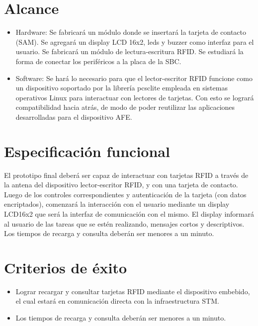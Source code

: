 \section{Alcance}

\begin{itemize}

\item Hardware: Se fabricar\'a un m\'odulo donde se insertar\'a la tarjeta de contacto (SAM).
Se agregar\'a un display LCD 16x2, leds y buzzer como interfaz para el usuario. Se fabricar\'a un m\'odulo de lectura-escritura RFID. Se estudiar\'a la forma de conectar los perif\'ericos a la placa de la SBC.

\item Software: Se har\'a lo necesario para que el lector-escritor RFID funcione como un dispositivo soportado por la librer\'ia pcsclite empleada en sistemas operativos Linux para interactuar con lectores de tarjetas. Con esto se lograr\'a compatibilidad hacia atr\'as, de modo de poder reutilizar las aplicaciones desarrolladas para el dispositivo AFE.
    
\end{itemize}

\section{Especificaci\'on funcional}

El prototipo final deber\'a ser capaz de interactuar con tarjetas RFID a trav\'es de la antena del dispositivo lector-escritor RFID, y con una tarjeta de contacto. Luego de los controles correspondientes y autenticaci\'on de la tarjeta (con datos encriptados), comenzar\'a la interacci\'on con el usuario mediante un display LCD16x2 que ser\'a la interfaz de comunicaci\'on con el mismo. El display informar\'a al usuario de las tareas que se est\'en realizando, mensajes cortos y descriptivos. Los tiempos de recarga y consulta deber\'an ser menores a un minuto.

\section{Criterios de \'exito}

\begin{itemize}

\item Lograr recargar y consultar tarjetas RFID mediante el dispositivo embebido, el cual estar\'a en comunicaci\'on directa con la infraestructura STM.

\item Los tiempos de recarga y consulta deber\'an ser menores a un minuto.

\end{itemize}